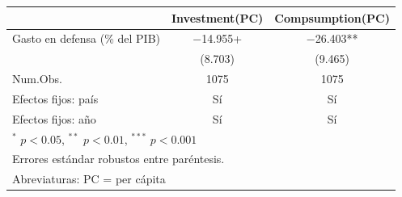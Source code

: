 \begin{tabular}[t]{lcc}
\toprule
  & Investment(PC) & Compsumption(PC)\\
\midrule
Gasto en defensa (\% del PIB) & \num{-14.955}+ & \num{-26.403}**\\
 & (\num{8.703}) & (\num{9.465})\\
\midrule
Num.Obs. & \num{1075} & \num{1075}\\
Efectos fijos: país & Sí & Sí\\
Efectos fijos: año & Sí & Sí\\
\bottomrule
\multicolumn{3}{l}{\rule{0pt}{1em}{\scriptsize $^{*}$ $p<0.05$, $^{**}$ $p<0.01$, $^{***}$ $p<0.001$}}\\[-1.1em]
\multicolumn{3}{l}{\rule{0pt}{1em}{\scriptsize Errores estándar robustos entre paréntesis.}}\\[-1.1em]
\multicolumn{3}{l}{\rule{0pt}{1em}{\scriptsize Abreviaturas: PC = per cápita}}\\[-1.1em]
\end{tabular}
